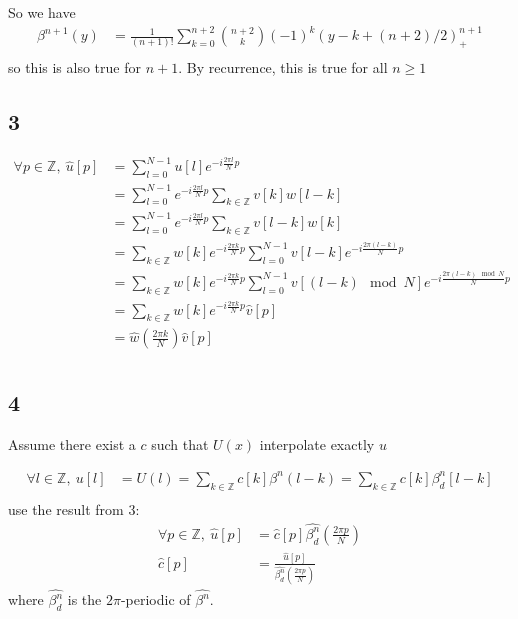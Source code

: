 \documentclass{article}
\begin{document}
	So we have
	\begin{equation*}
	\begin{split}
	\beta^{n+1}(y)
	&=\frac{1}{(n+1)!}\sum_{k=0}^{n+2} \binom{n+2}{k} (-1)^k (y-k+(n+2)/2)_+^{n+1}\\
	\end{split}
	\end{equation*}
	so this is also true for $n+1$.
	By recurrence, this is true for all $n\geq 1$
	\subsection*{3}
	\begin{equation*}
	\begin{split}
	\forall p\in \mathbb{Z},\ \hat{u}[p]&=\sum_{l=0}^{N-1} u[l] e^{-i\frac{2\pi l}{N}p}\\
	&=\sum_{l=0}^{N-1} e^{-i\frac{2\pi l}{N}p} \sum_{k\in\mathbb{Z}} v[k]w[l-k] \\
	&=\sum_{l=0}^{N-1} e^{-i\frac{2\pi l}{N}p} \sum_{k\in\mathbb{Z}} v[l-k]w[k] \\
	&=\sum_{k\in\mathbb{Z}} w[k]  e^{-i\frac{2\pi k}{N}p} \sum_{l=0}^{N-1}  v[l-k] e^{-i\frac{2\pi (l-k)}{N}p}  \\
	&=\sum_{k\in\mathbb{Z}} w[k]  e^{-i\frac{2\pi k}{N}p} \sum_{l=0}^{N-1}  v[(l-k)\mod N] e^{-i\frac{2\pi (l-k)\mod N}{N}p}  \\
	&=\sum_{k\in\mathbb{Z}} w[k]  e^{-i\frac{2\pi k}{N}p} \hat{v}[p]\\
	&=\hat{w}(\frac{2\pi k}{N})\hat{v}[p]\\
	\end{split}
	\end{equation*}
	
	\subsection*{4}
	Assume there exist a $c$ such that $U(x)$ interpolate exactly $u$
	
	\begin{equation*}
		\begin{split}
		\forall l\in \mathbb{Z},\ u[l]&=U(l)
		= \sum_{k\in\mathbb{Z}} c[k] \beta^n(l-k) = \sum_{k\in\mathbb{Z}} c[k] \beta^n_d[l-k]\\
		\end{split}
	\end{equation*}
	use the result from 3:
	\begin{equation*}
	\begin{split}
	\forall p\in \mathbb{Z},\ \hat{u}[p]&= \hat{c}[p] \hat{\beta^n_d}(\frac{2\pi p}{N})\\
	\hat{c}[p] &= \frac{\hat{u}[p]}{\hat{\beta^n_d}(\frac{2\pi p}{N})}
	\end{split}
	\end{equation*}
	where $\hat{\beta^n_d}$ is the $2\pi$-periodic of $\hat{\beta^n}$.
	
\end{document}
